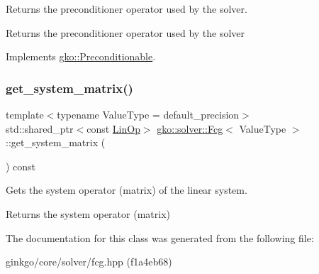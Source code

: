 Returns the preconditioner operator used by the solver. 

\begin{DoxyReturn}{Returns}
the preconditioner operator used by the solver 
\end{DoxyReturn}


Implements \hyperlink{classgko_1_1Preconditionable_ad9545089aef0dfc83bc7a74e5bf1d748}{gko\+::\+Preconditionable}.

\mbox{\label{classgko_1_1solver_1_1Fcg_aae8c67d27df239c18750845275605c87}} 
\subsubsection{\texorpdfstring{get\+\_\+system\+\_\+matrix()}{get\_system\_matrix()}}
{\footnotesize\ttfamily template$<$typename Value\+Type  = default\+\_\+precision$>$ \\
std\+::shared\+\_\+ptr$<$const \hyperlink{classgko_1_1LinOp}{Lin\+Op}$>$ \hyperlink{classgko_1_1solver_1_1Fcg}{gko\+::solver\+::\+Fcg}$<$ Value\+Type $>$\+::get\+\_\+system\+\_\+matrix (\begin{DoxyParamCaption}{ }\end{DoxyParamCaption}) const\hspace{0.3cm}{\ttfamily [inline]}}



Gets the system operator (matrix) of the linear system. 

\begin{DoxyReturn}{Returns}
the system operator (matrix) 
\end{DoxyReturn}


The documentation for this class was generated from the following file\+:\begin{DoxyCompactItemize}
\item 
ginkgo/core/solver/fcg.\+hpp (f1a4eb68)\end{DoxyCompactItemize}

